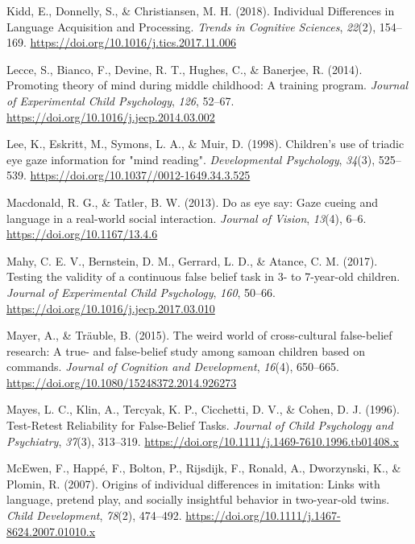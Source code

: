 \documentclass[
  man,floatsintext]{apa7}
\newlength{\cslhangindent}
\newlength{\cslentryspacingunit} %
\newenvironment{CSLReferences}[2] %
 {%
  \setlength{\parindent}{0pt}
  \ifodd #1
  \let\oldpar\par
  \def\par{\hangindent=\cslhangindent\oldpar}
  \fi
  \setlength{\parskip}{#2\cslentryspacingunit}
 }%
 {}
\begin{document}
\begin{CSLReferences}{1}{0}
\leavevmode{}%
Kidd, E., Donnelly, S., \& Christiansen, M. H. (2018). Individual {Differences} in {Language Acquisition} and {Processing}. \emph{Trends in Cognitive Sciences}, \emph{22}(2), 154--169. \url{https://doi.org/10.1016/j.tics.2017.11.006}

\leavevmode{}%
Lecce, S., Bianco, F., Devine, R. T., Hughes, C., \& Banerjee, R. (2014). Promoting theory of mind during middle childhood: {A} training program. \emph{Journal of Experimental Child Psychology}, \emph{126}, 52--67. \url{https://doi.org/10.1016/j.jecp.2014.03.002}

\leavevmode{}%
Lee, K., Eskritt, M., Symons, L. A., \& Muir, D. (1998). Children's use of triadic eye gaze information for "mind reading". \emph{Developmental Psychology}, \emph{34}(3), 525--539. \url{https://doi.org/10.1037//0012-1649.34.3.525}

\leavevmode{}%
Macdonald, R. G., \& Tatler, B. W. (2013). Do as eye say: {Gaze} cueing and language in a real-world social interaction. \emph{Journal of Vision}, \emph{13}(4), 6--6. \url{https://doi.org/10.1167/13.4.6}

\leavevmode{}%
Mahy, C. E. V., Bernstein, D. M., Gerrard, L. D., \& Atance, C. M. (2017). Testing the validity of a continuous false belief task in 3- to 7-year-old children. \emph{Journal of Experimental Child Psychology}, \emph{160}, 50--66. \url{https://doi.org/10.1016/j.jecp.2017.03.010}

\leavevmode{}%
Mayer, A., \& Träuble, B. (2015). The weird world of cross-cultural false-belief research: {A} true- and false-belief study among samoan children based on commands. \emph{Journal of Cognition and Development}, \emph{16}(4), 650--665. \url{https://doi.org/10.1080/15248372.2014.926273}

\leavevmode{}%
Mayes, L. C., Klin, A., Tercyak, K. P., Cicchetti, D. V., \& Cohen, D. J. (1996). Test-{Retest Reliability} for {False-Belief Tasks}. \emph{Journal of Child Psychology and Psychiatry}, \emph{37}(3), 313--319. \url{https://doi.org/10.1111/j.1469-7610.1996.tb01408.x}

\leavevmode{}%
McEwen, F., Happé, F., Bolton, P., Rijsdijk, F., Ronald, A., Dworzynski, K., \& Plomin, R. (2007). Origins of individual differences in imitation: Links with language, pretend play, and socially insightful behavior in two-year-old twins. \emph{Child Development}, \emph{78}(2), 474--492. \url{https://doi.org/10.1111/j.1467-8624.2007.01010.x}


\end{CSLReferences}
\end{document}
